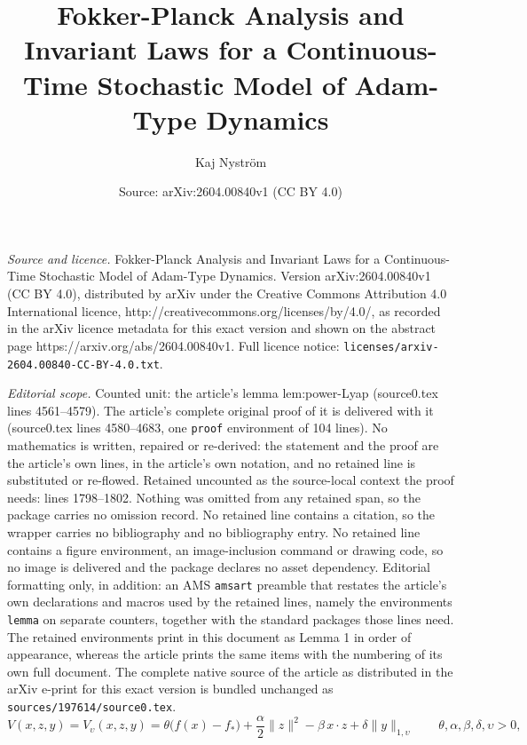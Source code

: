 \documentclass[10pt,a4paper]{amsart}
\title{Fokker-Planck Analysis and Invariant Laws for a Continuous-Time Stochastic Model of Adam-Type Dynamics}
\author{Kaj Nystr{\"o}m}
\date{Source: arXiv:2604.00840v1 (CC BY 4.0)}
\begin{document}
\maketitle

\noindent\emph{Source and licence.} Fokker-Planck Analysis and Invariant Laws for a Continuous-Time Stochastic Model of Adam-Type Dynamics. Version arXiv:2604.00840v1 (CC BY 4.0), distributed by arXiv under the Creative Commons Attribution 4.0 International licence, http://creativecommons.org/licenses/by/4.0/, as recorded in the arXiv licence metadata for this exact version and shown on the abstract page https://arxiv.org/abs/2604.00840v1. Full licence notice: \texttt{licenses/arxiv-2604.00840-CC-BY-4.0.txt}.\par\smallskip

\noindent\textit{Editorial scope.} Counted unit: the article's lemma lem:power-Lyap (source0.tex lines 4561--4579). The article's complete original proof of it is delivered with it (source0.tex lines 4580--4683, one \texttt{proof} environment of 104 lines). No mathematics is written, repaired or re-derived: the statement and the proof are the article's own lines, in the article's own notation, and no retained line is substituted or re-flowed.  Retained uncounted as the source-local context the proof needs: lines 1798--1802.  Nothing was omitted from any retained span, so the package carries no omission record.  No retained line contains a citation, so the wrapper carries no bibliography and no bibliography entry.  No retained line contains a figure environment, an image-inclusion command or drawing code, so no image is delivered and the package declares no asset dependency.  Editorial formatting only, in addition: an AMS \texttt{amsart} preamble that restates the article's own declarations and macros used by the retained lines, namely the environments \texttt{lemma} on separate counters, together with the standard packages those lines need.  The retained environments print in this document as Lemma 1 in order of appearance, whereas the article prints the same items with the numbering of its own full document.  The complete native source of the article as distributed in the arXiv e-print for this exact version is bundled unchanged as \texttt{sources/197614/source0.tex}.
\begin{equation}\label{V}
V(x,z,y)=V_\upsilon(x,z,y)
= \theta\bigl(f(x)-f_\ast\bigr) + \frac\alpha2\|z\|^2 - \beta\,x\cdot z + \delta \|y\|_{1,\upsilon}
\qquad \theta,\alpha,\beta,\delta, \upsilon>0,
\end{equation}
\end{document}
